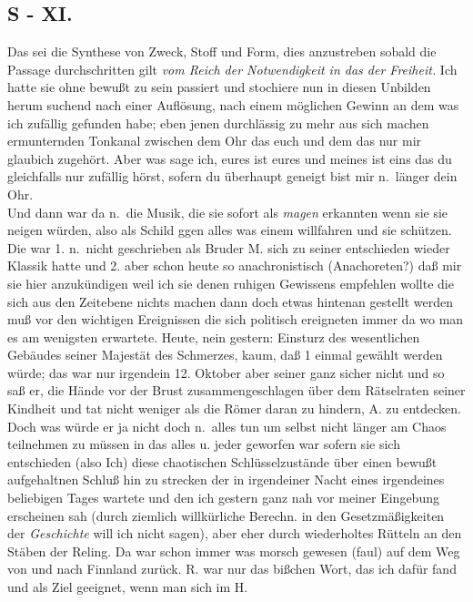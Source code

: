 \documentclass[
]{article}
\author{}
\date{\vspace{-2.5em}}
\begin{document}
\subsection{S - XI.}\label{s---xi.}

Das sei die Synthese von Zweck, Stoff und Form, dies anzustreben sobald
die Passage durchschritten gilt \emph{vom Reich der Notwendigkeit in das
der Freiheit. }Ich hatte sie ohne bewußt zu sein passiert und stochiere
nun in diesen Unbilden herum suchend nach einer Auflösung, nach einem
möglichen Gewinn an dem was ich zufällig gefunden habe; eben jenen
durchlässig zu mehr aus sich machen ermunternden Tonkanal zwischen dem
Ohr das euch und dem das nur mir glaubich zugehört. Aber was sage ich,
eures ist eures und meines ist eins das du gleichfalls nur zufällig
hörst, sofern du überhaupt geneigt bist mir n.~länger dein Ohr.\\
Und dann war da n.~die Musik, die sie sofort als \emph{magen} erkannten
wenn sie sie neigen würden, also als Schild ggen alles was einem
willfahren und sie schützen. Die war 1. n.~nicht geschrieben als Bruder
M. sich zu seiner entschieden wieder Klassik hatte und 2. aber schon
heute so anachronistisch (Anachoreten?) daß mir sie hier anzukündigen
weil ich sie denen ruhigen Gewissens empfehlen wollte die sich aus den
Zeitebene nichts machen dann doch etwas hintenan gestellt werden muß vor
den wichtigen Ereignissen die sich politisch ereigneten immer da wo man
es am wenigsten erwartete. Heute, nein gestern: Einsturz des
wesentlichen Gebäudes seiner Majestät des Schmerzes, kaum, daß 1 einmal
gewählt werden würde; das war nur irgendein 12. Oktober aber seiner ganz
sicher nicht und so saß er, die Hände vor der Brust zusammengeschlagen
über dem Rätselraten seiner Kindheit und tat nicht weniger als die Römer
daran zu hindern, A. zu entdecken. Doch was würde er ja nicht doch
n.~alles tun um selbst nicht länger am Chaos teilnehmen zu müssen in das
alles u. jeder geworfen war sofern sie sich entschieden (also Ich) diese
chaotischen Schlüsselzustände über einen bewußt aufgehaltnen Schluß hin
zu strecken der in irgendeiner Nacht eines irgendeines beliebigen Tages
wartete und den ich gestern ganz nah vor meiner Eingebung erscheinen sah
(durch ziemlich willkürliche Berechn. in den Gesetzmäßigkeiten der
\emph{Geschichte} will ich nicht sagen), aber eher durch wiederholtes
Rütteln an den Stäben der Reling. Da war schon immer was morsch gewesen
(faul) auf dem Weg von und nach Finnland zurück. R. war nur das bißchen
Wort, das ich dafür fand und als Ziel geeignet, wenn man sich im H.
\end{document}
